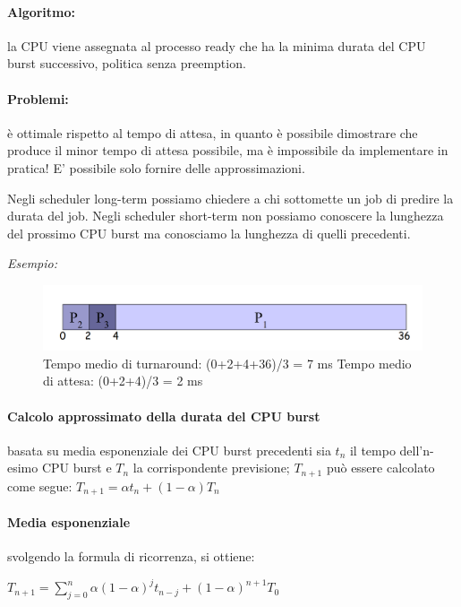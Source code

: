 \paragraph{Algoritmo:} la CPU viene assegnata al processo ready che ha la minima durata del CPU burst successivo, politica senza preemption.

\paragraph{Problemi:} è ottimale rispetto al tempo di attesa, in quanto è possibile dimostrare che produce il minor tempo di attesa possibile, ma è impossibile da implementare in pratica! E' possibile solo fornire delle approssimazioni.

Negli scheduler long-term possiamo chiedere a chi sottomette un job di predire la durata del job.
Negli scheduler short-term non possiamo conoscere la lunghezza del prossimo CPU burst ma conosciamo la lunghezza di quelli precedenti.

\textit{Esempio:}
\begin{figure} [h]
    \centering
    \includegraphics[width=0.5\linewidth]{Images/Screenshot 2024-12-23 at 14-33-56 so-02.1-scheduling - so-02.1-scheduling.pdf.png}
    \caption{Tempo medio di turnaround: (0+2+4+36)/3 = 7 ms
\newline
Tempo medio di attesa: (0+2+4)/3 = 2 ms}
\end{figure}


\paragraph{Calcolo approssimato della durata del CPU burst}
basata su media esponenziale dei CPU burst precedenti
sia $t_n$ il tempo dell'n-esimo CPU burst e $T_n$ la corrispondente previsione;
$T_{n+1}$ può essere calcolato come segue:
$T_{n+1} = \alpha t_{n} + (1-\alpha) T_{n}$

\paragraph{Media esponenziale}
svolgendo la formula di ricorrenza, si ottiene:
\newline

$T_{n+1} = \sum_{j=0}^n \alpha(1-\alpha)^j t_{n-j} + (1-\alpha)^{n+1} T_0$
\newline

